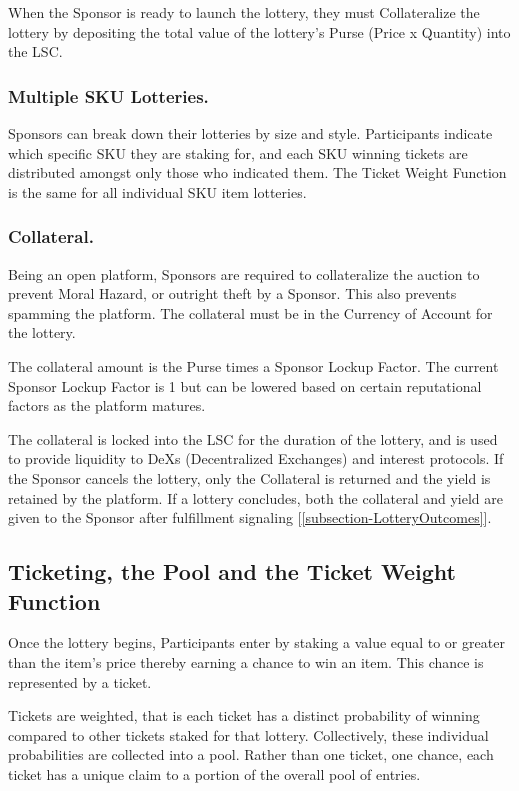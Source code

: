 \documentclass[runningheads]{llncs}
\begin{document}
When the Sponsor is ready to launch the lottery, they must Collateralize the lottery by depositing the total value of the lottery’s Purse (Price x Quantity) into the LSC.

\subsubsection{Multiple SKU Lotteries.}  Sponsors can break down their lotteries by size and style.  Participants indicate which specific SKU they are staking for, and each SKU winning tickets are distributed amongst only those who indicated them.  The Ticket Weight Function is the same for all individual SKU item lotteries.

\subsubsection{Collateral.}  Being an open platform, Sponsors are required to collateralize the auction to prevent Moral Hazard, or outright theft by a Sponsor.  This also prevents spamming the platform.  The collateral must be in the Currency of Account for the lottery.  

The collateral amount is the Purse times a Sponsor Lockup Factor.  The current Sponsor Lockup Factor is 1 but can be lowered based on certain reputational factors as the platform matures.

The collateral is locked into the LSC for the duration of the lottery, and is used to provide liquidity to DeXs (Decentralized Exchanges) and interest protocols.  If the Sponsor cancels the lottery, only the Collateral is returned and the yield is retained by the platform.  If a lottery concludes, both the collateral and yield are given to the Sponsor after fulfillment signaling [\ref{subsection-LotteryOutcomes}].


\subsection{Ticketing, the Pool and the Ticket Weight Function}\label{subsection-Ticketing}
Once the lottery begins, Participants enter by staking a value equal to or greater than the item’s price thereby earning a chance to win an item.  This chance is represented by a ticket.  

Tickets are weighted, that is each ticket has a distinct probability of winning compared to other tickets staked for that lottery.  Collectively, these individual probabilities are collected into a pool.  Rather than one ticket, one chance, each ticket has a unique claim to a portion of the overall pool of entries.  
\end{document}
